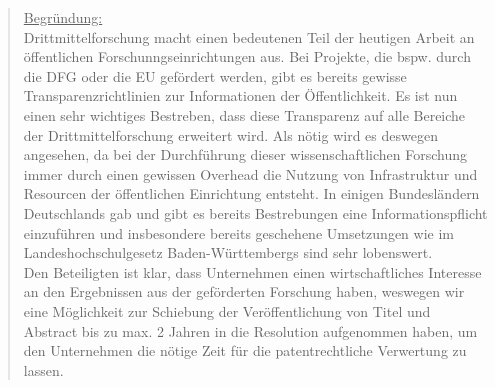 \documentclass[10pt,oneside]{scrartcl}
\begin{document}
\begin{quote}
\underline{Begründung:}\\
Drittmittelforschung macht einen bedeutenen Teil der heutigen Arbeit an öffentlichen Forschunngseinrichtungen aus. Bei Projekte, die bspw. durch die DFG oder die EU gefördert werden, gibt es bereits gewisse Transparenzrichtlinien zur Informationen der Öffentlichkeit. Es ist nun einen sehr wichtiges Bestreben, dass diese Transparenz auf alle Bereiche der Drittmittelforschung erweitert wird. Als nötig wird es deswegen angesehen, da bei der Durchführung dieser wissenschaftlichen Forschung immer durch einen gewissen Overhead die Nutzung von Infrastruktur und Resourcen der öffentlichen Einrichtung entsteht. In einigen Bundesländern Deutschlands gab und gibt es bereits Bestrebungen eine Informationspflicht einzuführen und insbesondere bereits geschehene Umsetzungen wie im Landeshochschulgesetz Baden-Württembergs sind sehr lobenswert.\\
Den Beteiligten ist klar, dass Unternehmen einen wirtschaftliches Interesse an den Ergebnissen aus der geförderten Forschung haben, weswegen wir eine Möglichkeit zur Schiebung der Veröffentlichung von Titel und Abstract bis zu max. 2 Jahren in die Resolution aufgenommen haben, um den Unternehmen die nötige Zeit für die patentrechtliche Verwertung zu lassen.

\end{quote}
\end{document}
